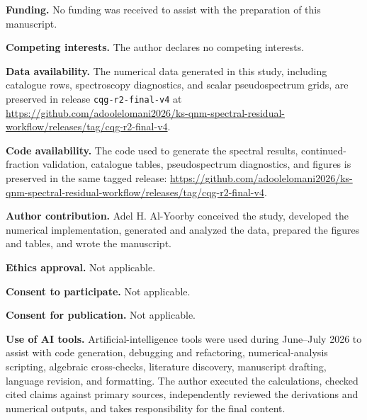 \documentclass[12pt,a4paper]{article}
\begin{document}
\noindent\textbf{Funding.}
No funding was received to assist with the preparation of this manuscript.

\noindent\textbf{Competing interests.}
The author declares no competing interests.

\noindent\textbf{Data availability.}
\color{blue}
The numerical data generated in this study, including catalogue rows,
spectroscopy diagnostics, and scalar pseudospectrum grids, are preserved in
release \texttt{cqg-r2-final-v4} at
\url{https://github.com/adoolelomani2026/ks-qnm-spectral-residual-workflow/releases/tag/cqg-r2-final-v4}.
\color{black}

\noindent\textbf{Code availability.}
\color{blue}
The code used to generate the spectral results, continued-fraction validation,
catalogue tables, pseudospectrum diagnostics, and figures is preserved in the
same tagged release:
\url{https://github.com/adoolelomani2026/ks-qnm-spectral-residual-workflow/releases/tag/cqg-r2-final-v4}.
\color{black}

\noindent\textbf{Author contribution.}
Adel H. Al-Yoorby conceived the study, developed the numerical implementation, generated and analyzed the data, prepared the figures and tables, and wrote the manuscript.

\noindent\textbf{Ethics approval.}
Not applicable.

\noindent\textbf{Consent to participate.}
Not applicable.

\noindent\textbf{Consent for publication.}
Not applicable.

\noindent\textbf{Use of AI tools.}
\color{blue}
Artificial-intelligence tools were used during June--July 2026 to assist with
code generation, debugging and refactoring,
numerical-analysis scripting, algebraic cross-checks, literature discovery,
manuscript drafting, language revision, and formatting. The author executed
the calculations, checked cited claims against primary sources, independently
reviewed the derivations and numerical outputs, and takes responsibility for
the final content.
\color{black}
\end{document}

